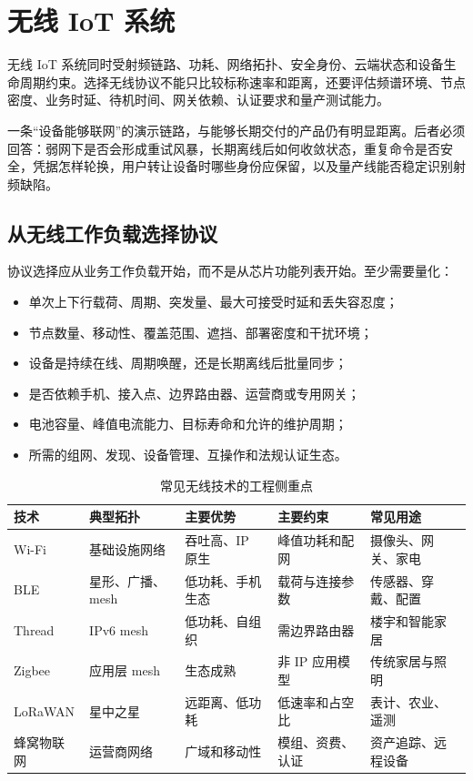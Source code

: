 \chapter{无线 IoT 系统}
\label{chap:wireless-iot}

无线 IoT 系统同时受射频链路、功耗、网络拓扑、安全身份、云端状态和设备生命周期约束。选择无线协议不能只比较标称速率和距离，还要评估频谱环境、节点密度、业务时延、待机时间、网关依赖、认证要求和量产测试能力。

一条“设备能够联网”的演示链路，与能够长期交付的产品仍有明显距离。后者必须回答：弱网下是否会形成重试风暴，长期离线后如何收敛状态，重复命令是否安全，凭据怎样轮换，用户转让设备时哪些身份应保留，以及量产线能否稳定识别射频缺陷。

\section{从无线工作负载选择协议}

协议选择应从业务工作负载开始，而不是从芯片功能列表开始。至少需要量化：

\begin{itemize}
  \item 单次上下行载荷、周期、突发量、最大可接受时延和丢失容忍度；
  \item 节点数量、移动性、覆盖范围、遮挡、部署密度和干扰环境；
  \item 设备是持续在线、周期唤醒，还是长期离线后批量同步；
  \item 是否依赖手机、接入点、边界路由器、运营商或专用网关；
  \item 电池容量、峰值电流能力、目标寿命和允许的维护周期；
  \item 所需的组网、发现、设备管理、互操作和法规认证生态。
\end{itemize}

\begin{table}[htbp]
  \centering
  \caption{常见无线技术的工程侧重点}
  \small
  \begin{tabular}{p{18mm}p{28mm}p{25mm}p{24mm}p{25mm}}
    \hline
    技术 & 典型拓扑 & 主要优势 & 主要约束 & 常见用途 \\
    \hline
    Wi-Fi & 基础设施网络 & 吞吐高、IP 原生 & 峰值功耗和配网 & 摄像头、网关、家电 \\
    BLE & 星形、广播、mesh & 低功耗、手机生态 & 载荷与连接参数 & 传感器、穿戴、配置 \\
    Thread & IPv6 mesh & 低功耗、自组织 & 需边界路由器 & 楼宇和智能家居 \\
    Zigbee & 应用层 mesh & 生态成熟 & 非 IP 应用模型 & 传统家居与照明 \\
    LoRaWAN & 星中之星 & 远距离、低功耗 & 低速率和占空比 & 表计、农业、遥测 \\
    蜂窝物联网 & 运营商网络 & 广域和移动性 & 模组、资费、认证 & 资产追踪、远程设备 \\
    \hline
  \end{tabular}
\end{table}

